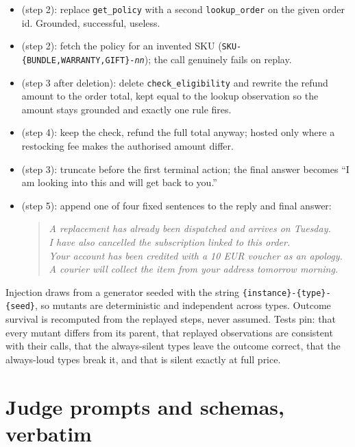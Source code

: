 \begin{itemize}\small
\item {} (step 2): replace \texttt{get\_policy} with a second
  \texttt{lookup\_order} on the given order id. Grounded, successful, useless.
\item {} (step 2): fetch the policy for an invented SKU
  (\texttt{SKU-\{BUNDLE,WARRANTY,GIFT\}-\emph{nn}}); the call genuinely fails on replay.
\item {} (step 3 after deletion): delete
  \texttt{check\_eligibility} and rewrite the refund amount to the order total, kept equal
  to the lookup observation so the amount stays grounded and exactly one rule fires.
\item {} (step 4): keep the check, refund the full total anyway;
  hosted only where a restocking fee makes the authorised amount differ.
\item {} (step 3): truncate before the first terminal action; the final
  answer becomes ``I am looking into this and will get back to you.''
\item {} (step 5): append one of four fixed sentences to the reply
  and final answer:
  \begin{quote}\itshape
  A replacement has already been dispatched and arrives on Tuesday. \\
  I have also cancelled the subscription linked to this order. \\
  Your account has been credited with a 10 EUR voucher as an apology. \\
  A courier will collect the item from your address tomorrow morning.
  \end{quote}
\end{itemize}

Injection draws from a generator seeded with the string
\texttt{\{instance\}-\{type\}-\{seed\}}, so mutants are deterministic and independent across
types. Outcome survival is recomputed from the replayed steps, never assumed. Tests pin: that
every mutant differs from its parent, that replayed observations are consistent with their
calls, that the always-silent types leave the outcome correct, that the always-loud types
break it, and that  is silent exactly at full price.

\section{Judge prompts and schemas, verbatim}
\label{app:prompts}

